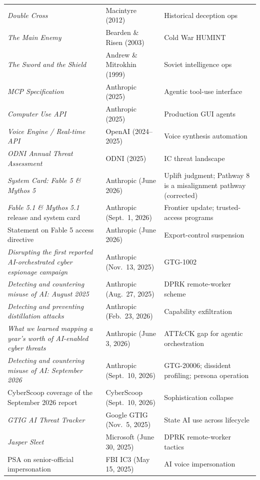 \documentclass[11pt,letterpaper]{article}
\begin{document}
{\begin{longtable}{L{6.4cm}L{4.4cm}L{5.2cm}}
\textit{Double Cross} & Macintyre (2012) & Historical deception ops \\
\textit{The Main Enemy} & Bearden \& Risen (2003) & Cold War HUMINT \\
\textit{The Sword and the Shield} & Andrew \& Mitrokhin (1999) & Soviet intelligence ops \\
\textit{MCP Specification} & Anthropic (2025) & Agentic tool-use interface \\
\textit{Computer Use API} & Anthropic (2025) & Production GUI agents \\
\textit{Voice Engine / Real-time API} & OpenAI (2024--2025) & Voice synthesis automation \\
\textit{ODNI Annual Threat Assessment} & ODNI (2025) & IC threat landscape \\
\textit{System Card: Fable 5 \& Mythos 5} & Anthropic (June 2026) & Uplift judgment; Pathway 8 is a misalignment pathway (corrected) \\
\textit{Fable 5.1 \& Mythos 5.1} release and system card & Anthropic (Sept.\ 1, 2026) & Frontier update; trusted-access programs \\
Statement on Fable 5 access directive & Anthropic (June 2026) & Export-control suspension \\
\textit{Disrupting the first reported AI-orchestrated cyber espionage campaign} & Anthropic (Nov.\ 13, 2025) & GTG-1002 \\
\textit{Detecting and countering misuse of AI: August 2025} & Anthropic (Aug.\ 27, 2025) & DPRK remote-worker scheme \\
\textit{Detecting and preventing distillation attacks} & Anthropic (Feb.\ 23, 2026) & Capability exfiltration \\
\textit{What we learned mapping a year's worth of AI-enabled cyber threats} & Anthropic (June 3, 2026) & ATT\&CK gap for agentic orchestration \\
\textit{Detecting and countering misuse of AI: September 2026} & Anthropic (Sept.\ 10, 2026) & GTG-20006; dissident profiling; persona operation \\
CyberScoop coverage of the September 2026 report & CyberScoop (Sept.\ 10, 2026) & Sophistication collapse \\
\textit{GTIG AI Threat Tracker} & Google GTIG (Nov.\ 5, 2025) & State AI use across lifecycle \\
\textit{Jasper Sleet} & Microsoft (June 30, 2025) & DPRK remote-worker tactics \\
PSA on senior-official impersonation & FBI IC3 (May 15, 2025) & AI voice impersonation \\

\end{longtable}}
\end{document}
